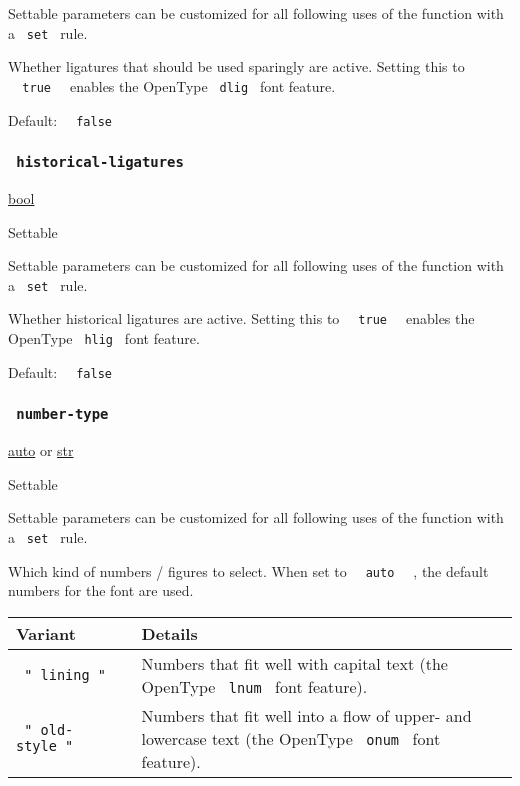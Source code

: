 \label{parameters-discretionary-ligatures-settable-tooltip}
Settable parameters can be customized for all following uses of the
function with a \texttt{\ set\ } rule.

Whether ligatures that should be used sparingly are active. Setting this
to \texttt{\ }{\texttt{\ true\ }}\texttt{\ } enables the OpenType
\texttt{\ dlig\ } font feature.

Default: \texttt{\ }{\texttt{\ false\ }}\texttt{\ }

\subsubsection{\texorpdfstring{\texttt{\ historical-ligatures\ }}{ historical-ligatures }}\label{parameters-historical-ligatures}

\href{/docs/reference/foundations/bool/}{bool}

{{ Settable }}

\label{parameters-historical-ligatures-settable-tooltip}
Settable parameters can be customized for all following uses of the
function with a \texttt{\ set\ } rule.

Whether historical ligatures are active. Setting this to
\texttt{\ }{\texttt{\ true\ }}\texttt{\ } enables the OpenType
\texttt{\ hlig\ } font feature.

Default: \texttt{\ }{\texttt{\ false\ }}\texttt{\ }

\subsubsection{\texorpdfstring{\texttt{\ number-type\ }}{ number-type }}\label{parameters-number-type}

\href{/docs/reference/foundations/auto/}{auto} {or}
\href{/docs/reference/foundations/str/}{str}

{{ Settable }}

\label{parameters-number-type-settable-tooltip}
Settable parameters can be customized for all following uses of the
function with a \texttt{\ set\ } rule.

Which kind of numbers / figures to select. When set to
\texttt{\ }{\texttt{\ auto\ }}\texttt{\ } , the default numbers for the
font are used.

\begin{longtable}[]{@{}ll@{}}
\toprule\noalign{}
Variant & Details \\
\midrule\noalign{}
\endhead
\bottomrule\noalign{}
\endlastfoot
\texttt{\ "\ lining\ "\ } & Numbers that fit well with capital text (the
OpenType \texttt{\ lnum\ } font feature). \\
\texttt{\ "\ old-style\ "\ } & Numbers that fit well into a flow of
upper- and lowercase text (the OpenType \texttt{\ onum\ } font
feature). \\
\end{longtable}

